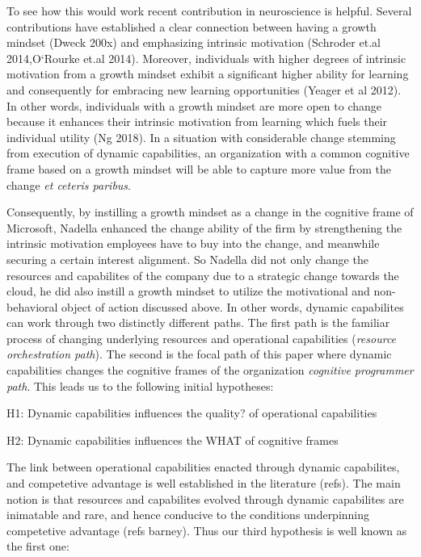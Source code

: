 To see how this would work recent contribution in neuroscience is helpful. Several
contributions have established a clear connection between having a growth mindset (Dweck 200x) and
emphasizing intrinsic motivation (Schroder et.al 2014,O`Rourke et.al 2014). Moreover,
individuals with higher degrees of intrinsic motivation from a growth mindset exhibit a
significant higher ability for learning and consequently for embracing new learning
opportunities (Yeager et al 2012). In other words, individuals with a growth mindset are
more open to change because it enhances their intrinsic motivation from learning which
fuels their individual utility (Ng 2018). In a situation with considerable change stemming
from execution of dynamic capabilities, an organization with a common cognitive frame
based on a growth mindset will be able to capture more value from the change \emph{et
  ceteris paribus}.

Consequently, by instilling a growth mindset as a change in the cognitive frame of
Microsoft, Nadella enhanced the change ability of the firm by strengthening the intrinsic
motivation employees have to buy into the change, and meanwhile securing a certain
interest alignment. So Nadella did not only change the resources and capabilites of the
company due to a strategic change towards the cloud, he did also instill a growth mindset
to utilize the motivational and non-behavioral object of action discussed above. In other
words, dynamic capabilites can work through two distinctly different paths. The first path
is the familiar process of changing underlying resources and operational capabilities
(\emph{resource orchestration path}). The second is the focal path of this paper where
dynamic capabilities changes the cognitive frames of the organization \emph{cognitive
  programmer path}. This leads us to the following initial hypotheses:

H1: Dynamic capabilities influences the quality? of operational capabilities 

H2: Dynamic capabilities influences the WHAT of cognitive frames 

The link between operational capabilities enacted through dynamic capabilites, and
competetive advantage is well established in the literature (refs). The main notion is
that resources and capabilites evolved through dynamic capabilites are inimatable and
rare, and hence conducive to the conditions underpinning competetive advantage (refs
barney). Thus our third hypothesis is well known as the first one:

